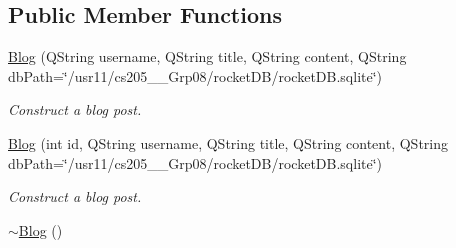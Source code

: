 \subsection*{Public Member Functions}
\begin{DoxyCompactItemize}
\item 
\hyperlink{classBlog_af1f9e5fcb1bd0fa3efb89bf7ed43b688}{Blog} (Q\+String username, Q\+String title, Q\+String content, Q\+String db\+Path=\char`\"{}/usr11/cs205\+\_\+\_\+\+Grp08/rocket\+DB/rocket\+D\+B.\+sqlite\char`\"{})
\begin{DoxyCompactList}\small\item\em Construct a blog post. \end{DoxyCompactList}\item 
\hyperlink{classBlog_a457335b60a87bad653d8fdd2101efac5}{Blog} (int id, Q\+String username, Q\+String title, Q\+String content, Q\+String db\+Path=\char`\"{}/usr11/cs205\+\_\+\_\+\+Grp08/rocket\+DB/rocket\+D\+B.\+sqlite\char`\"{})
\begin{DoxyCompactList}\small\item\em Construct a blog post. \end{DoxyCompactList}\item 
\hyperlink{classBlog_a0b2c662d24dee57b9b897e9aaef74233}{$\sim$\+Blog} ()\hypertarget{classBlog_a0b2c662d24dee57b9b897e9aaef74233}{}\label{classBlog_a0b2c662d24dee57b9b897e9aaef74233}


\end{DoxyCompactItemize}
